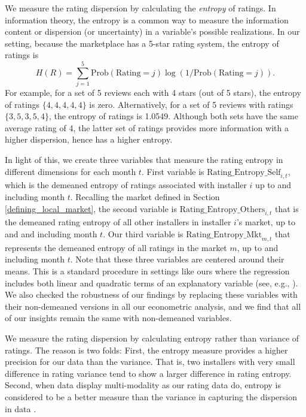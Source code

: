 \documentclass[mnsc,blindrev]{informs3}
\begin{document}
	We measure the rating dispersion by calculating the \emph{entropy} of ratings. In information theory, the entropy is a common way to measure the information content or dispersion (or uncertainty) in a variable's possible realizations. In our setting, because the marketplace has a 5-star rating system, the entropy of ratings is
	\begin{equation}\label{def: entropy}
	H(R)= \sum_{j=1}^{5} \text{Prob}(\text{Rating}=j) \log(1/\text{Prob}(\text{Rating}=j)).
	\end{equation}
	For example, for a set of 5 reviews each with 4 stars (out of 5 stars), the entropy of ratings $\{4,4,4,4,4\}$ is zero. Alternatively, for a set of 5 reviews with ratings $\{3,5,3,5,4\}$, the entropy of ratings is 1.0549. Although both sets have the same average rating of 4, the latter set of ratings provides more information with a higher dispersion, hence has a higher entropy.
	
	
	In light of this, we create three variables that measure the rating entropy in different dimensions for each month $t$. First variable is $\text{Rating\_Entropy\_Self}_{i,t}$, which is the demeaned entropy of ratings associated with installer $i$ up to and including month $t$. Recalling the market defined in Section \ref{defining_local_market}, the second variable is $\text{Rating\_Entropy\_Others}_{i,t}$ that is the demeaned rating entropy of all other installers in installer $i$'s market, up to and and including month $t$. Our third variable is $\text{Rating\_Entropy\_Mkt}_{m,t}$ that represents the demeaned entropy of all ratings in the market $m$, up to and including month $t$. Note that these three variables are centered around their means. This is a standard procedure in settings like ours where the regression includes both linear and quadratic terms of an explanatory variable (see, e.g., \cite{tan2014does}). We also checked the robustness of our findings by replacing these variables with their non-demeaned versions in all our econometric analysis, and we find that all of our insights remain the same with non-demeaned variables.
	
	We measure the rating dispersion by calculating entropy rather than variance of ratings. The reason is two folds: First, the entropy measure provides a higher precision for our data than the variance. That is, two installers with very small difference in rating variance tend to show a larger difference in rating
entropy. Second, when data display multi-modality as our rating data do, entropy is considered to be a better measure than the variance in capturing the dispersion in data \citep{smaldino2013measures}.
	
\end{document}
